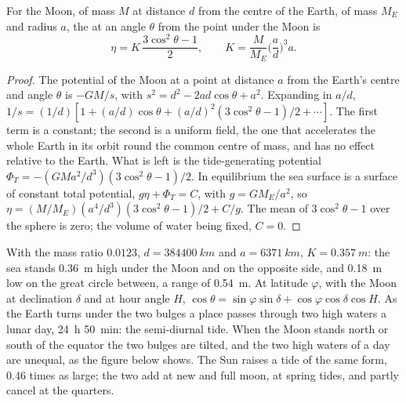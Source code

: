 \begin{theorem}\label{thm:b3:ocean-dynamics:equilibrium-tide}
For the Moon, of mass $M$ at distance $d$ from the centre of the Earth, of
mass $M_E$ and radius $a$, the  at an angle $\theta$ from
the point under the Moon is
\[
\eta = K\,\frac{3\cos^2\theta - 1}{2},\qquad
K = \frac{M}{M_E}\Big(\frac{a}{d}\Big)^3 a .
\]
\end{theorem}

\begin{proof}
The potential of the Moon at a point at distance $a$ from the Earth's
centre and angle $\theta$ is $-GM/s$, with $s^2 = d^2 - 2ad\cos\theta +
a^2$. Expanding in $a/d$, $1/s = (1/d)[1 + (a/d)\cos\theta + (a/d)^2
(3\cos^2\theta - 1)/2 + \cdots]$. The first term is a constant; the second
is a uniform field, the one that accelerates the whole Earth in its orbit
round the common centre of mass, and has no effect relative to the Earth.
What is left is the tide-generating potential $\Phi_T = -(GMa^2/d^3)(3
\cos^2\theta - 1)/2$. In equilibrium the sea surface is a surface of
constant total potential, $g\eta + \Phi_T = C$, with $g = GM_E/a^2$, so
$\eta = (M/M_E)(a^4/d^3)(3\cos^2\theta - 1)/2 + C/g$. The mean of
$3\cos^2\theta - 1$ over the sphere is zero; the volume of water being
fixed, $C = 0$.
\end{proof}

With the mass ratio $0.0123$, $d = \qty{384400}{km}$ and $a =
\qty{6371}{km}$, $K = \qty{0.357}{m}$: the sea stands \qty{0.36}{m}
high under the Moon and on the opposite side, and \qty{0.18}{m} low on the
great circle between, a range of \qty{0.54}{m}. At latitude $\varphi$, with
the Moon at declination $\delta$ and at hour angle $H$, $\cos\theta =
\sin\varphi\sin\delta + \cos\varphi\cos\delta\cos H$. As the Earth turns
under the two bulges a place passes through two high waters a lunar day,
\qty{24}{h} \qty{50}{min}: the semi-diurnal tide. When the Moon stands
north or south of the equator the two bulges are tilted, and the two high
waters of a day are unequal, as the figure below shows. The Sun raises a
tide of the same form, \num{0.46} times as large; the two add at new and
full moon, at spring tides, and partly cancel at the quarters.

